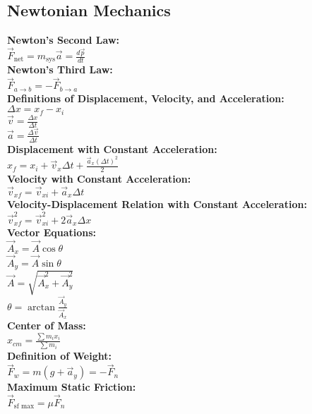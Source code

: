 \documentclass[12pt]{article}
\begin{document}
\subsection*{Newtonian Mechanics}
\textbf{Newton’s Second Law:}
    \\ \( \vec{ F }_{\text{net}} = m_{\text{sys}} \vec{ a } = \displaystyle\frac{ d \vec{ p } }{ dt } \)
\\ \textbf{Newton’s Third Law:  }
    \\ \( \vec{ F }_{a \rightarrow{b}} = - \vec{ F }_{b \rightarrow{a}} \)
\\ \textbf{Definitions of Displacement, Velocity, and Acceleration:}
    \\ \( \Delta x = x_f - x_i \)
    \\ \( \vec{ v } = \displaystyle\frac{ \Delta x }{ \Delta t } \)
    \\ \( \vec{ a } = \displaystyle\frac{ \Delta \vec{ v } }{ \Delta t } \)
\\ \textbf{Displacement with Constant Acceleration:}
    \\ \( x_f = x_i + \vec{ v }_x \Delta t + \displaystyle\frac{ \vec{ a }_x ( \Delta t )^2 }{ 2 } \)
\\ \textbf{Velocity with Constant Acceleration:}
    \\ \( \vec{ v }_{xf} = \vec{ v }_{xi} + \vec{ a }_x \Delta t \)
\\ \textbf{Velocity-Displacement Relation with Constant Acceleration:}
    \\ \( \vec{ v }_{xf}^2 = \vec{ v }_{xi}^2 + 2 \vec{ a }_x \Delta x \)
\\ \textbf{Vector Equations:}
    \\ \( \vec{ A }_x = \vec{ A } \cos \theta \)
    \\ \( \vec{ A }_y = \vec{ A } \sin \theta \)
    \\ \( \vec{ A } = \sqrt{ \vec{ A }_{x}^2 + \vec{ A }_{y}^2 } \)
    \\ \( \theta = \arctan \displaystyle\frac{ \vec{ A }_y }{ \vec{ A }_x } \)
\\ \textbf{Center of Mass:}
    \\ \( x_{cm} = \displaystyle\frac{ \displaystyle\sum{ m_i x_i } }{ \displaystyle\sum{ m_i } } \)
\\ \textbf{Definition of Weight:}
    \\ \( \vec{ F }_w = m( g + \vec{ a }_y ) = -\vec{ F }_n \)
\\ \textbf{Maximum Static Friction:}
    \\ \( \vec{ F }_{\text{sf max}} = \mu \vec{ F }_n \)
\end{document}
